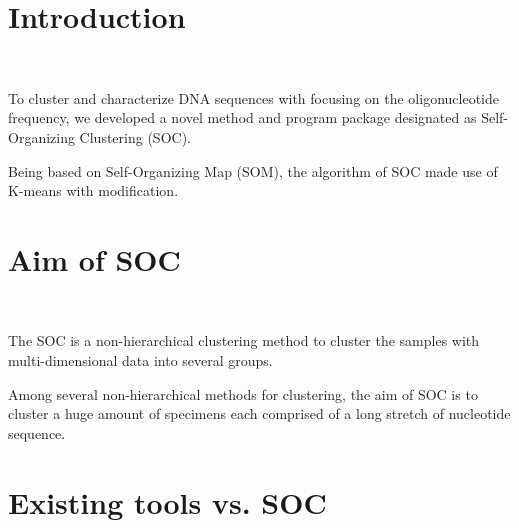 \documentclass[portrait,a0]{a0poster}
\begin{document}
\begin{multicols}{3}
\color[cmyk]{0,0,0,1}
\section{Introduction}
\

\vspace{-40pt} To cluster and characterize DNA sequences with focusing on the oligonucleotide frequency, we developed a novel method and program package designated as Self-Organizing Clustering (SOC).

Being based on Self-Organizing Map (SOM)\cite{Ikemura-2001}, the algorithm of SOC made use of K-means with modification.

\vspace{-5mm}\section{Aim of SOC}
\

\vspace{-40pt} The SOC is a non-hierarchical clustering method to cluster the samples with multi-dimensional data into several groups.

Among several non-hierarchical methods for clustering, the aim of SOC is to cluster a huge amount of specimens each comprised of a long stretch of nucleotide sequence.

\vspace{-5mm}\section{Existing tools vs. SOC}


\end{multicols}
\end{document}
